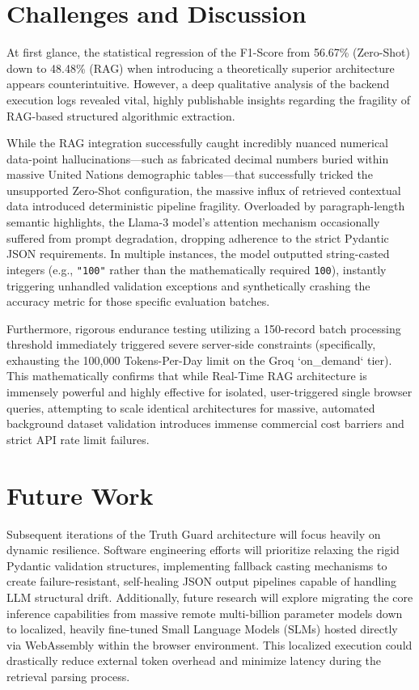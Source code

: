\documentclass[conference]{IEEEtran}
\begin{document}
\section{Challenges and Discussion}
At first glance, the statistical regression of the F1-Score from 56.67\% (Zero-Shot) down to 48.48\% (RAG) when introducing a theoretically superior architecture appears counterintuitive. However, a deep qualitative analysis of the backend execution logs revealed vital, highly publishable insights regarding the fragility of RAG-based structured algorithmic extraction.

While the RAG integration successfully caught incredibly nuanced numerical data-point hallucinations—such as fabricated decimal numbers buried within massive United Nations demographic tables—that successfully tricked the unsupported Zero-Shot configuration, the massive influx of retrieved contextual data introduced deterministic pipeline fragility. Overloaded by paragraph-length semantic highlights, the Llama-3 model's attention mechanism occasionally suffered from prompt degradation, dropping adherence to the strict Pydantic JSON requirements. In multiple instances, the model outputted string-casted integers (e.g., \texttt{"100"} rather than the mathematically required \texttt{100}), instantly triggering unhandled validation exceptions and synthetically crashing the accuracy metric for those specific evaluation batches.

Furthermore, rigorous endurance testing utilizing a 150-record batch processing threshold immediately triggered severe server-side constraints (specifically, exhausting the 100,000 Tokens-Per-Day limit on the Groq `on\_demand` tier). This mathematically confirms that while Real-Time RAG architecture is immensely powerful and highly effective for isolated, user-triggered single browser queries, attempting to scale identical architectures for massive, automated background dataset validation introduces immense commercial cost barriers and strict API rate limit failures.

\section{Future Work}
Subsequent iterations of the Truth Guard architecture will focus heavily on dynamic resilience. Software engineering efforts will prioritize relaxing the rigid Pydantic validation structures, implementing fallback casting mechanisms to create failure-resistant, self-healing JSON output pipelines capable of handling LLM structural drift. Additionally, future research will explore migrating the core inference capabilities from massive remote multi-billion parameter models down to localized, heavily fine-tuned Small Language Models (SLMs) hosted directly via WebAssembly within the browser environment. This localized execution could drastically reduce external token overhead and minimize latency during the retrieval parsing process.
\end{document}
